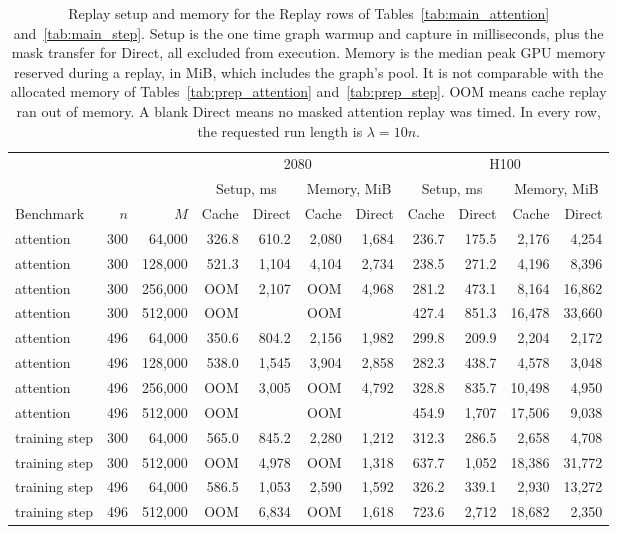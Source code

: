 \begin{table}[!htbp]
\caption{Replay setup and memory for the Replay rows of Tables~\ref{tab:main_attention} and~\ref{tab:main_step}. Setup is the one time graph warmup and capture in milliseconds, plus the mask transfer for Direct, all excluded from execution. Memory is the median peak GPU memory reserved during a replay, in MiB, which includes the graph's pool. It is not comparable with the allocated memory of Tables~\ref{tab:prep_attention} and~\ref{tab:prep_step}. OOM means cache replay ran out of memory. A blank Direct means no masked attention replay was timed. In every row, the requested run length is $\lambda = 10n$.}
\label{tab:replay_setup}
\footnotesize
\setlength{\tabcolsep}{2.5pt}
\begin{tabular}{lrr rrrr rrrr}
\toprule
 &  &  & \multicolumn{4}{c}{2080} & \multicolumn{4}{c}{H100} \\
\cmidrule(lr){4-7} \cmidrule(lr){8-11}
 &  &  & \multicolumn{2}{c}{Setup, ms} & \multicolumn{2}{c}{Memory, MiB} & \multicolumn{2}{c}{Setup, ms} & \multicolumn{2}{c}{Memory, MiB} \\
\cmidrule(lr){4-5} \cmidrule(lr){6-7} \cmidrule(lr){8-9} \cmidrule(lr){10-11}
Benchmark & $n$ & $M$ & Cache & Direct & Cache & Direct & Cache & Direct & Cache & Direct \\
\midrule
attention & 300 & 64,000 & 326.8 & 610.2 & 2,080 & 1,684 & 236.7 & 175.5 & 2,176 & 4,254 \\
attention & 300 & 128,000 & 521.3 & 1,104 & 4,104 & 2,734 & 238.5 & 271.2 & 4,196 & 8,396 \\
attention & 300 & 256,000 & OOM & 2,107 & OOM & 4,968 & 281.2 & 473.1 & 8,164 & 16,862 \\
attention & 300 & 512,000 & OOM &  & OOM &  & 427.4 & 851.3 & 16,478 & 33,660 \\
attention & 496 & 64,000 & 350.6 & 804.2 & 2,156 & 1,982 & 299.8 & 209.9 & 2,204 & 2,172 \\
attention & 496 & 128,000 & 538.0 & 1,545 & 3,904 & 2,858 & 282.3 & 438.7 & 4,578 & 3,048 \\
attention & 496 & 256,000 & OOM & 3,005 & OOM & 4,792 & 328.8 & 835.7 & 10,498 & 4,950 \\
attention & 496 & 512,000 & OOM &  & OOM &  & 454.9 & 1,707 & 17,506 & 9,038 \\
\midrule
training step & 300 & 64,000 & 565.0 & 845.2 & 2,280 & 1,212 & 312.3 & 286.5 & 2,658 & 4,708 \\
training step & 300 & 512,000 & OOM & 4,978 & OOM & 1,318 & 637.7 & 1,052 & 18,386 & 31,772 \\
training step & 496 & 64,000 & 586.5 & 1,053 & 2,590 & 1,592 & 326.2 & 339.1 & 2,930 & 13,272 \\
training step & 496 & 512,000 & OOM & 6,834 & OOM & 1,618 & 723.6 & 2,712 & 18,682 & 2,350 \\
\bottomrule
\end{tabular}
\end{table}